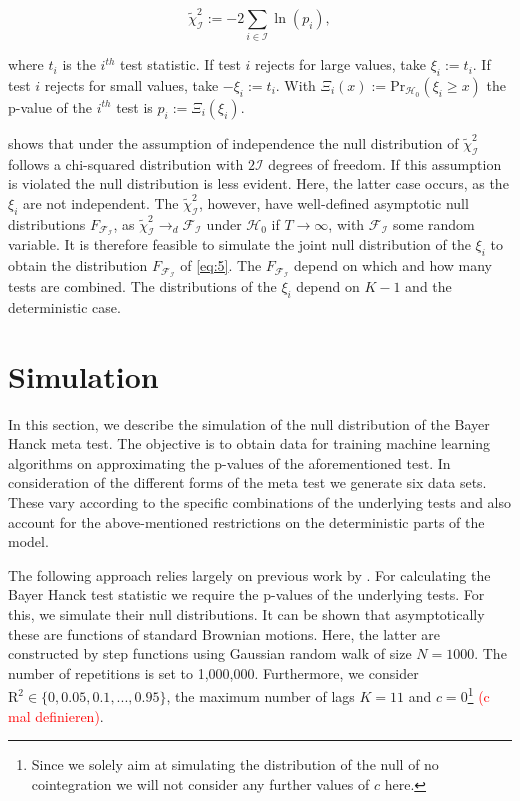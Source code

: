 \documentclass[12pt,a4paper]{article}
\let\rmarkdownfootnote\footnote%
\def\footnote{\protect\rmarkdownfootnote}
\begin{document}
\begin{equation}
\tilde{\chi}^2_{\mathcal{I}} := -2 \sum_{i \in \mathcal{I}} \ln{(p_i)},
\label{eq:5}
\end{equation}

where \(t_i\) is the \(i^{th}\) test statistic. If test \(i\) rejects
for large values, take \(\xi_i := t_i\). If test \(i\) rejects for small
values, take \(-\xi_i := t_i\). With
\(\Xi_i(x) := \text{Pr}_{\mathcal{H_0}}(\xi_i \geq x)\) the p-value of
the \(i^{th}\) test is \(p_i := \Xi_i(\xi_i)\).

\textcite{Fisher_1932} shows that under the assumption of independence
the null distribution of \(\tilde{\chi}^2_{\mathcal{I}}\) follows a
chi-squared distribution with \(2\mathcal{I}\) degrees of freedom. If
this assumption is violated the null distribution is less evident. Here,
the latter case occurs, as the \(\xi_i\) are not independent. The
\(\tilde{\chi}^2_{\mathcal{I}}\), however, have well-defined asymptotic
null distributions \(F_{\mathcal{F_I}}\), as
\(\tilde{\chi}^2_{\mathcal{I}} \rightarrow_d \mathcal{F_I}\) under
\(\mathcal{H}_0\) if \(T \rightarrow \infty\), with \(\mathcal{F_I}\)
some random variable. It is therefore feasible to simulate the joint
null distribution of the \(\xi_i\) to obtain the distribution
\(F_{\mathcal{F_I}}\) of \eqref{eq:5}. The \(F_{\mathcal{F_I}}\) depend
on which and how many tests are combined. The distributions of the
\(\xi_i\) depend on \(K-1\) and the deterministic case.

\hypertarget{simulation}{%
\section{Simulation}\label{simulation}}

In this section, we describe the simulation of the null distribution of
the Bayer Hanck meta test. The objective is to obtain data for training
machine learning algorithms on approximating the p-values of the
aforementioned test. In consideration of the different forms of the meta
test we generate six data sets. These vary according to the specific
combinations of the underlying tests and also account for the
above-mentioned restrictions on the deterministic parts of the model.

The following approach relies largely on previous work by
\textcite{Pesavento_2004}. For calculating the Bayer Hanck test
statistic we require the p-values of the underlying tests. For this, we
simulate their null distributions. It can be shown that asymptotically
these are functions of standard Brownian motions. Here, the latter are
constructed by step functions using Gaussian random walk of size
\(N = 1000\). The number of repetitions is set to 1,000,000.
Furthermore, we consider \(\text{R}^2 \in \{0, 0.05, 0.1, ..., 0.95\}\),
the maximum number of lags \(K = 11\) and \(c = 0\)\footnote{Since we
  solely aim at simulating the distribution of the null of no
  cointegration we will not consider any further values of \(c\) here.}
\textcolor{red}{(c mal definieren)}.
\end{document}
